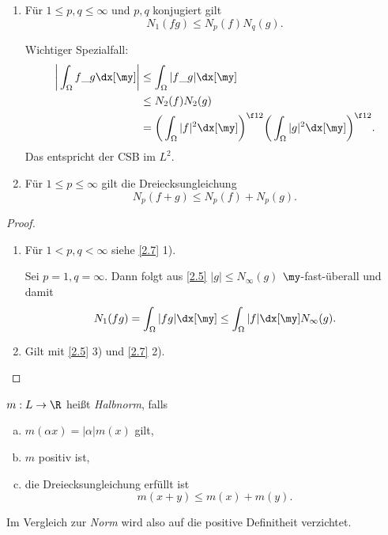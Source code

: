 \begin{kor} \label{2.8}
	\begin{enumerate}[1)]
		\item
			Für $1 \le p,q \le \infty$ und $p,q$ konjugiert gilt
			\[
				N_1(fg) \le N_p(f) N_q(g).
			\]
			\begin{note}
				Wichtiger Spezialfall:
				\begin{align*}
					\bigg| \int_{\Omega} f \_g \dx[\my] \bigg|
					&\le \int_{\Omega} |f \_g| \dx[\my] \\
					&\le N_2(f) N_2(g) \\
					&= \bigg( \int_{\Omega} |f|^2 \dx[\my] \bigg)^{\f 12} \bigg( \int_{\Omega} |g|^2 \dx[\my] \bigg)^{\f 12}.
				\end{align*}
				Das entspricht der CSB im $L^2$.
			\end{note}
		\item
			Für $1 \le p \le \infty$ gilt die Dreiecksungleichung
			\[
				N_p(f+g) \le N_p(f) + N_p(g).
			\]
	\end{enumerate}
	\begin{proof}
		\begin{enumerate}[1)]
			\item
				Für $1 < p,q < \infty$ siehe \ref{2.7} 1).

				Sei $p=1, q = \infty$.
				Dann folgt aus \ref{2.5} $|g| \le N_\infty(g)$ $\my$-fast-überall und damit
				\[
					N_1(fg) = \int_{\Omega} |fg| \dx[\my] \le \int_{\Omega}|f| \dx[\my] N_\infty (g).
				\]
			\item
				Gilt mit \ref{2.5} 3) und \ref{2.7} 2).
		\end{enumerate}
	\end{proof}
\end{kor}

\begin{df*} 
	$m : L \to \R$ heißt \emph{Halbnorm}, falls
	\begin{enumerate}[a)]
		\item
			$\displaystyle m(\alpha x) = |\alpha| m(x)$ gilt,
		\item
			$m$ positiv ist,
		\item
			die Dreiecksungleichung erfüllt ist
			\[
				m(x+y) \le m(x) + m(y).
			\]
	\end{enumerate}
	\begin{note}
		Im Vergleich zur \emph{Norm} wird also auf die positive Definitheit verzichtet.
	\end{note}
\end{df*}

